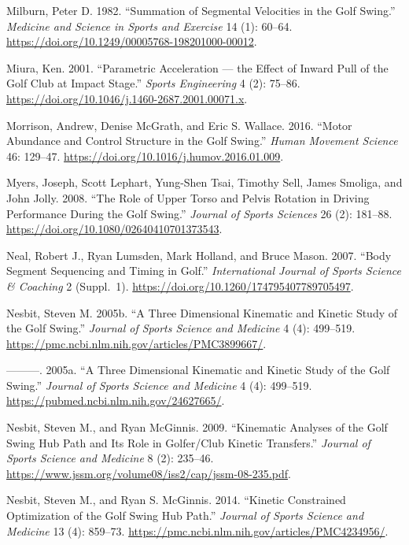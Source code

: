 \documentclass[
  letterpaper,
]{report}
\newlength{\cslhangindent}
\newenvironment{CSLReferences}[2] %
 {\begin{list}{}{%
  \setlength{\itemindent}{0pt}
  \setlength{\leftmargin}{0pt}
  \setlength{\parsep}{0pt}
  \ifodd #1
   \setlength{\leftmargin}{\cslhangindent}
   \setlength{\itemindent}{-1\cslhangindent}
  \fi
  \setlength{\itemsep}{#2\baselineskip}}}
 {\end{list}}
\begin{document}
\begin{CSLReferences}{1}{0}
Milburn, Peter D. 1982. {``Summation of Segmental Velocities in the Golf
Swing.''} \emph{Medicine and Science in Sports and Exercise} 14 (1):
60--64. \url{https://doi.org/10.1249/00005768-198201000-00012}.

Miura, Ken. 2001. {``Parametric Acceleration --- the Effect of Inward
Pull of the Golf Club at Impact Stage.''} \emph{Sports Engineering} 4
(2): 75--86. \url{https://doi.org/10.1046/j.1460-2687.2001.00071.x}.

Morrison, Andrew, Denise McGrath, and Eric S. Wallace. 2016. {``Motor
Abundance and Control Structure in the Golf Swing.''} \emph{Human
Movement Science} 46: 129--47.
\url{https://doi.org/10.1016/j.humov.2016.01.009}.

Myers, Joseph, Scott Lephart, Yung-Shen Tsai, Timothy Sell, James
Smoliga, and John Jolly. 2008. {``The Role of Upper Torso and Pelvis
Rotation in Driving Performance During the Golf Swing.''} \emph{Journal
of Sports Sciences} 26 (2): 181--88.
\url{https://doi.org/10.1080/02640410701373543}.

Neal, Robert J., Ryan Lumsden, Mark Holland, and Bruce Mason. 2007.
{``Body Segment Sequencing and Timing in Golf.''} \emph{International
Journal of Sports Science \& Coaching} 2 (Suppl.~1).
\url{https://doi.org/10.1260/174795407789705497}.

Nesbit, Steven M. 2005b. {``A Three Dimensional Kinematic and Kinetic
Study of the Golf Swing.''} \emph{Journal of Sports Science and
Medicine} 4 (4): 499--519.
\url{https://pmc.ncbi.nlm.nih.gov/articles/PMC3899667/}.

---------. 2005a. {``A Three Dimensional Kinematic and Kinetic Study of
the Golf Swing.''} \emph{Journal of Sports Science and Medicine} 4 (4):
499--519. \url{https://pubmed.ncbi.nlm.nih.gov/24627665/}.

Nesbit, Steven M., and Ryan McGinnis. 2009. {``Kinematic Analyses of the
Golf Swing Hub Path and Its Role in Golfer/Club Kinetic Transfers.''}
\emph{Journal of Sports Science and Medicine} 8 (2): 235--46.
\url{https://www.jssm.org/volume08/iss2/cap/jssm-08-235.pdf}.

Nesbit, Steven M., and Ryan S. McGinnis. 2014. {``Kinetic Constrained
Optimization of the Golf Swing Hub Path.''} \emph{Journal of Sports
Science and Medicine} 13 (4): 859--73.
\url{https://pmc.ncbi.nlm.nih.gov/articles/PMC4234956/}.


\end{CSLReferences}
\end{document}
